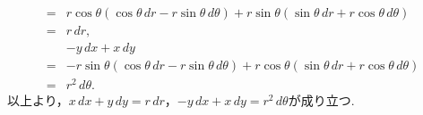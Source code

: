 \begin{tanswer}
\begin{align*}
    = & r \cos \theta(\cos \theta \, dr - r \sin \theta \, d \theta)+r \sin \theta(\sin \theta \, dr + r \cos \theta \, d \theta) \\
    = & r \, dr,                                                                                                                  \\
      & -y \, dx + x \, dy                                                                                                        \\
    = & -r \sin \theta (\cos \theta  \, dr -r\sin \theta \, d\theta)+r \cos \theta (\sin \theta \, dr + r \cos \theta \, d\theta) \\
    = & r^2 \, d \theta.
  \end{align*}
  以上より，$x \, dx +y \, dy = r \, dr$，$-y \, dx + x \, dy  = r^2 \, d \theta$が成り立つ.
\end{tanswer}


